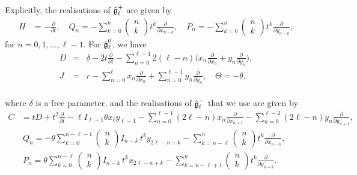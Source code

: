 \documentclass[12pt]{article}
\begin{document}
Explicitly, the realisations of $\mathfrak{\Hat{g}}^+_{\ell}$  are given by 
\begin{eqnarray*}
H&=-\frac{\partial}{\partial t}, \quad  Q_{n} =-\sum\limits_{k=0}^{n} \left(
     \begin{array}{c}
       n \\
       k
     \end{array}
   \right)t^{k}\frac{\partial}{\partial x_{n-k}} , \quad
 P_{n} =-\sum\limits_{k=0}^{n} \left(
     \begin{array}{c}
       n \\
       k
     \end{array}
   \right)t^{k}\frac{\partial}{\partial y_{n-k}},
\end{eqnarray*}
for $n=0,1,\ldots,\ell-1$. For $\mathfrak{\Hat{g}}^0_{\ell}$, we have 
\begin{eqnarray*}
D&=&\delta-2t\frac{\partial}{\partial t}-\sum\limits_{n=0}^{\ell-1}2(\ell-n) \bigg(x_{n}\frac{\partial}{\partial x_{n}}+y_{n}\frac{\partial}{\partial y_{n}}\bigg), \\ 
 J&=&r-\sum\limits_{n=0}^{\ell} x_{n}\frac{\partial}{\partial x_{n}}+\sum\limits_{n=0}^{\ell-1} y_{n}\frac{\partial}{\partial y_{n}}, \quad \Theta=- \theta ,
\end{eqnarray*} \\
where $\delta$ is a free parameter, and the realisations of
$\mathfrak{\Hat{g}}^-_{\ell}$ that we use are given by 
\begin{eqnarray*}
C&=t D +t^2\frac{\partial}{\partial t}-\ell I_{\ell+1} \theta x_{\ell}y_{\ell-1}-\sum\limits_{n=0}^{\ell-1}(2\ell-n)x_{n}\frac{\partial}{\partial x_{n+1}}-\sum\limits_{n=0}^{\ell-2}(2\ell-n)y_{n}\frac{\partial}{\partial y_{n+1}},\\
 &\ Q_{n}=- \theta \sum\limits_{k=0}^{n-\ell-1}\left(
     \begin{array}{c}
       n \\
      k 
     \end{array}
   \right)I_{n-k} \, t^{k}{ y_{2\ell-n+k}}-\sum\limits_{k=n-\ell}^{n} \left(
     \begin{array}{c}
       n \\
      k
     \end{array}
   \right)t^{k}\frac{\partial}{\partial x_{n-k}}, \\ 
    &\ P_{n}=\theta \sum\limits_{k=0}^{n-\ell}\left(
     \begin{array}{c}
       n \\
      k 
     \end{array}
   \right)I_{n-k} \, t^{k} x_{2\ell-n+k}- \sum\limits_{k=n-\ell+1}^{n} \left(
     \begin{array}{c}
       n \\
      k
     \end{array}
   \right)t^{k}\frac{\partial}{\partial y_{n-k}}.   
\end{eqnarray*}
\end{document}
